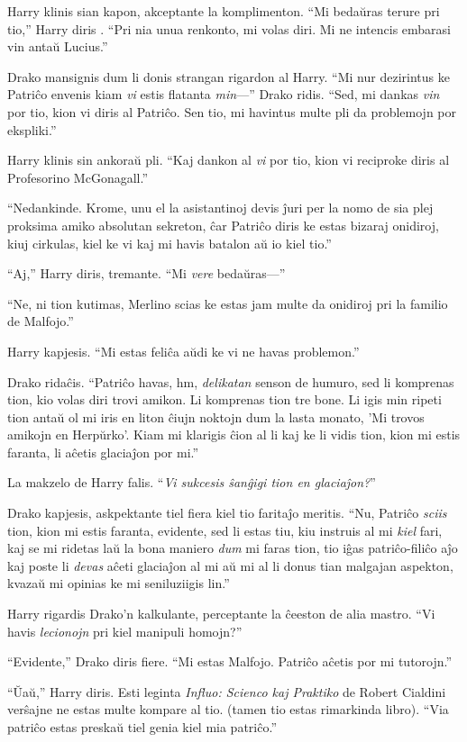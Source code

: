 Harry klinis sian kapon, akceptante la komplimenton. ``Mi bedaŭras
terure pri tio,'' Harry diris . ``Pri nia unua renkonto, mi volas
diri. Mi ne intencis embarasi vin antaŭ Lucius.''

Drako mansignis dum li donis strangan rigardon al Harry. ``Mi nur
dezirintus ke Patriĉo envenis kiam \emph{vi} estis flatanta
\emph{min}—'' Drako ridis. ``Sed, mi dankas \emph{vin} por tio, kion
vi diris al Patriĉo. Sen tio, mi havintus multe pli da problemojn por
ekspliki.''

Harry klinis sin ankoraŭ pli. ``Kaj dankon al \emph{vi} por tio, kion
vi reciproke diris al Profesorino McGonagall.''

``Nedankinde. Krome, unu el la asistantinoj devis ĵuri per la nomo de
sia plej proksima amiko absolutan sekreton, ĉar Patriĉo diris ke estas
bizaraj onidiroj, kiuj cirkulas, kiel ke vi kaj mi havis batalon aŭ
io kiel tio.''

``Aj,'' Harry diris, tremante. ``Mi \emph{vere} bedaŭras—''

``Ne, ni tion kutimas, Merlino scias ke estas jam multe da onidiroj
pri la familio de Malfojo.''


Harry kapjesis. ``Mi estas feliĉa aŭdi ke vi ne havas problemon.''

Drako ridaĉis. ``Patriĉo havas, hm, \emph{delikatan} senson de humuro,
sed li komprenas tion, kio volas diri trovi amikon. Li komprenas tion
tre bone. Li igis min ripeti tion antaŭ ol mi iris en liton ĉiujn
noktojn dum la lasta monato, 'Mi trovos amikojn en Herpŭrko'. Kiam mi
klarigis ĉion al li kaj ke li vidis tion, kion mi estis faranta, li
aĉetis glaciaĵon por mi.''

La makzelo de Harry falis. ``\emph{Vi sukcesis ŝanĝigi tion en glaciaĵon?}''

Drako kapjesis, askpektante tiel fiera kiel tio faritaĵo
meritis. ``Nu, Patriĉo \emph{sciis} tion, kion mi estis faranta,
evidente, sed li estas tiu, kiu instruis al mi \emph{kiel} fari, kaj
se mi ridetas laŭ la bona maniero \emph{dum} mi faras tion, tio iĝas
patriĉo-filiĉo aĵo kaj poste li \emph{devas} aĉeti glaciaĵon al mi aŭ
mi al li donus tian malgajan aspekton, kvazaŭ mi opinias ke mi
seniluziigis lin.''

Harry rigardis Drako'n kalkulante, perceptante la ĉeeston de alia
mastro. ``Vi havis \emph{lecionojn} pri kiel manipuli homojn?''

``Evidente,'' Drako diris fiere. ``Mi estas Malfojo. Patriĉo aĉetis por
mi tutorojn.''

``Ŭaŭ,'' Harry diris. Esti leginta \emph{Influo: Scienco kaj Praktiko}
de Robert Cialdini verŝajne ne estas multe kompare al tio. (tamen tio
estas rimarkinda libro). ``Via patriĉo estas preskaŭ tiel genia kiel mia
patriĉo.''

